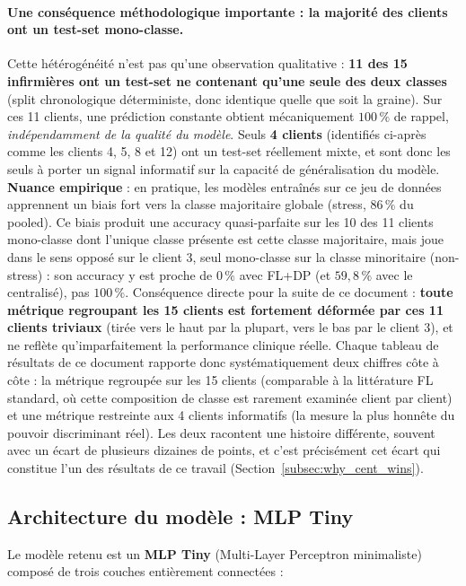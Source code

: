 \documentclass{article}
\begin{document}
\paragraph{Une conséquence méthodologique importante : la majorité des clients ont un
test-set mono-classe.} Cette hétérogénéité n'est pas qu'une observation qualitative :
\textbf{11 des 15 infirmières ont un test-set ne contenant qu'une seule des deux
classes} (split chronologique déterministe, donc identique quelle que soit la graine).
Sur ces 11 clients, une prédiction constante obtient mécaniquement $100\,\%$ de rappel,
\emph{indépendamment de la qualité du modèle}. Seuls \textbf{4 clients} (identifiés
ci-après comme les clients 4, 5, 8 et 12) ont un test-set réellement mixte, et sont donc
les seuls à porter un signal informatif sur la capacité de généralisation du modèle.
\textbf{Nuance empirique} : en pratique, les modèles entraînés sur ce jeu de données
apprennent un biais fort vers la classe majoritaire globale (stress, $86\,\%$ du
pooled). Ce biais produit une accuracy quasi-parfaite sur les 10 des 11 clients
mono-classe dont l'unique classe présente est cette classe majoritaire, mais joue dans
le sens opposé sur le client 3, seul mono-classe sur la classe minoritaire
(non-stress) : son accuracy y est proche de $0\,\%$ avec FL+DP (et $59{,}8\,\%$ avec le
centralisé), pas $100\,\%$. Conséquence directe pour la suite de ce document :
\textbf{toute métrique regroupant les 15 clients est fortement déformée par ces 11
clients triviaux} (tirée vers le haut par la plupart, vers le bas par le client 3), et
ne reflète qu'imparfaitement la performance clinique réelle. Chaque tableau de résultats de
ce document rapporte donc systématiquement deux chiffres côte à côte : la métrique
regroupée sur les 15 clients (comparable à la littérature FL standard, où cette
composition de classe est rarement examinée client par client) et une métrique
restreinte aux 4 clients informatifs (la mesure la plus honnête du pouvoir discriminant
réel). Les deux racontent une histoire différente, souvent avec un écart de plusieurs
dizaines de points, et c'est précisément cet écart qui constitue l'un des résultats de
ce travail (Section~\ref{subsec:why_cent_wins}).

\subsection{Architecture du modèle : MLP Tiny}
\label{subsec:model}

Le modèle retenu est un \textbf{MLP Tiny} (Multi-Layer Perceptron minimaliste) composé
de trois couches entièrement connectées :
\end{document}
